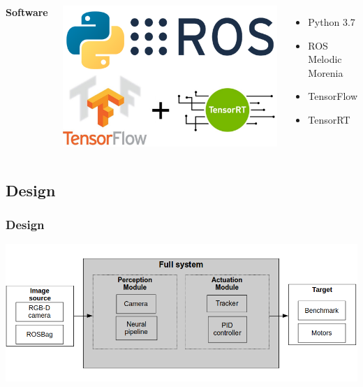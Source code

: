 \documentclass[11pt]{beamer}
\begin{document}
\begin{frame}
\begin{columns}
			\textbf{Software}\\
			\vspace{0.6cm}
			\begin{center}
				\includegraphics[width=0.9\linewidth]{software} \\
			\end{center}
			\vspace{0.4cm}
			\begin{itemize}
				\item Python 3.7
				\item ROS Melodic Morenia
				\item TensorFlow
				\item TensorRT
			\end{itemize}
	\end{columns}	
\end{frame}
\subsection{Design}
\begin{frame}
	\frametitle{Design}
	\includegraphics[width=\linewidth]{functional_architecture}
\end{frame}
\end{document}
